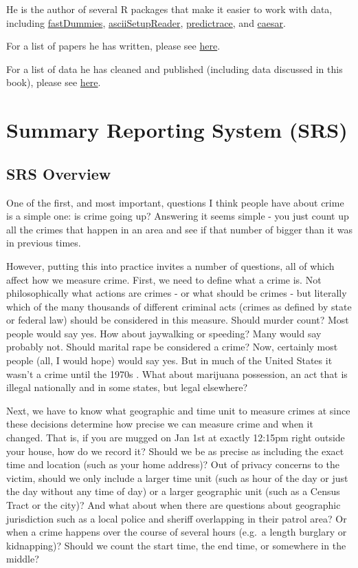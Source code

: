\documentclass[
  12pt,
  openany]{book}
\begin{document}
He is the author of several R packages that make it easier to work with data, including \href{https://jacobkap.github.io/fastDummies/}{fastDummies}, \href{https://jacobkap.github.io/asciiSetupReader/}{asciiSetupReader}, \href{https://jacobkap.github.io/predictrace/}{predictrace}, and \href{https://jacobkap.github.io/caesar/}{caesar}.

For a list of papers he has written, please see \href{https://jacobdkaplan.weebly.com/research.html}{here}.

For a list of data he has cleaned and published (including data discussed in this book), please see \href{https://jacobdkaplan.weebly.com/data.html}{here}.

\part{Summary Reporting System (SRS)}\label{part-summary-reporting-system-srs}

\chapter{SRS Overview}\label{SRSGeneral}

One of the first, and most important, questions I think people have about crime is a simple one: is crime going up? Answering it seems simple - you just count up all the crimes that happen in an area and see if that number of bigger than it was in previous times.

However, putting this into practice invites a number of questions, all of which affect how we measure crime. First, we need to define what a crime is. Not philosophically what actions are crimes - or what should be crimes - but literally which of the many thousands of different criminal acts (crimes as defined by state or federal law) should be considered in this measure. Should murder count? Most people would say yes. How about jaywalking or speeding? Many would say probably not. Should marital rape be considered a crime? Now, certainly most people (all, I would hope) would say yes. But in much of the United States it wasn't a crime until the 1970s \citep{bennice2003marital, mcmahon2009criminalizing}. What about marijuana possession, an act that is illegal nationally and in some states, but legal elsewhere?

Next, we have to know what geographic and time unit to measure crimes at since these decisions determine how precise we can measure crime and when it changed. That is, if you are mugged on Jan 1st at exactly 12:15pm right outside your house, how do we record it? Should we be as precise as including the exact time and location (such as your home address)? Out of privacy concerns to the victim, should we only include a larger time unit (such as hour of the day or just the day without any time of day) or a larger geographic unit (such as a Census Tract or the city)? And what about when there are questions about geographic jurisdiction such as a local police and sheriff overlapping in their patrol area? Or when a crime happens over the course of several hours (e.g.~a length burglary or kidnapping)? Should we count the start time, the end time, or somewhere in the middle?
\end{document}
